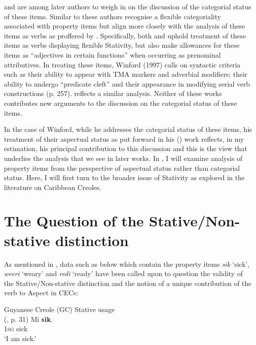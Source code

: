 \citet{Winford1997} and \citet{Migge2000} are among later authors to
weigh in on the discussion of the categorial status of these items.
Similar to \citet{Kouwenberg1996} these authors recognise a flexible
categoriality associated with property items but align more closely
with the analysis of these items as verbs as proffered by
\citet{Sebba1986}.  Specifically, both \citet{Winford1997} and
\citet{Migge2000} uphold treatment of these items as verbs displaying
flexible Stativity, but also make allowances for these items as
“adjectives in certain functions” \citep[249]{Winford1997} when
occurring as prenominal attributives.  In treating these items,
Winford (1997) calls on syntactic criteria such as their ability to appear
with TMA markers and adverbial modifiers; their ability to undergo
“predicate cleft” and their appearance in modifying serial verb
constructions (p. 257).  \citet{Migge2000} reflects a similar
analysis.  Neither of these works contributes new arguments to the
discussion on the categorial status of these items.

In the case of Winford, while he addresses the categorial status of
these items, his treatment of their aspectual status as put forward in
his (\citeyear{Winford1993}) work reflects, in my estimation, his principal
contribution to this discussion and this is the view that underlies
the analysis that we see in later works.  In , I will
examine  analysis of property items from the
perspective of aspectual status rather than categorial status.  Here,
I will first turn to the broader issue of Stativity as explored in the
literature on Caribbean Creoles.

\section{The Question of the Stative/Non-stative
  distinction}\label{sec:3.2}

As mentioned in , data such as  below which contain
the property items \textit{sik} `sick', \textit{weeri} `weary' and
\textit{redi}  `ready' have been called upon to question the validity
of the Stative\slash Non-stative distinction and the notion of a unique
contribution of the verb to Aspect in CECs:

\ea%
\label{ex:3:15}

Guyanese Creole (GC) Stative usage\\(\citealt{Jaganauth1987}, p. 31)
\ea
\gll  Mi \textbf{sik}.\\
		\textsc{1sg} sick\\
\glt `I am sick.'


